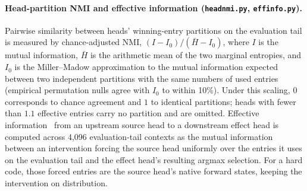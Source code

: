 \paragraph{Head-partition NMI and effective information (\texttt{headnmi.py},
\texttt{effinfo.py}).}
Pairwise similarity between heads' winning-entry partitions on the
evaluation tail is measured by chance-adjusted NMI,
$(I - I_0)/(\bar{H} - I_0)$, where $I$ is the mutual information, $\bar{H}$
is the arithmetic mean of the two marginal entropies, and $I_0$ is the
Miller--Madow approximation to the mutual information expected between two
independent partitions with the same numbers of used entries (empirical
permutation nulls agree with $I_0$ to within 10\%). Under this scaling, $0$
corresponds to chance agreement and $1$ to identical partitions; heads with
fewer than $1.1$ effective entries carry no partition and are omitted.
Effective information~\cite{hoel2013} from an upstream source head to a
downstream effect head is computed across 4{,}096 evaluation-tail contexts
as the mutual information between an intervention forcing the source head
uniformly over the entries it uses on the evaluation tail and the effect
head's resulting argmax selection. For a hard code, those forced entries
are the source head's native forward states, keeping the intervention on
distribution.

